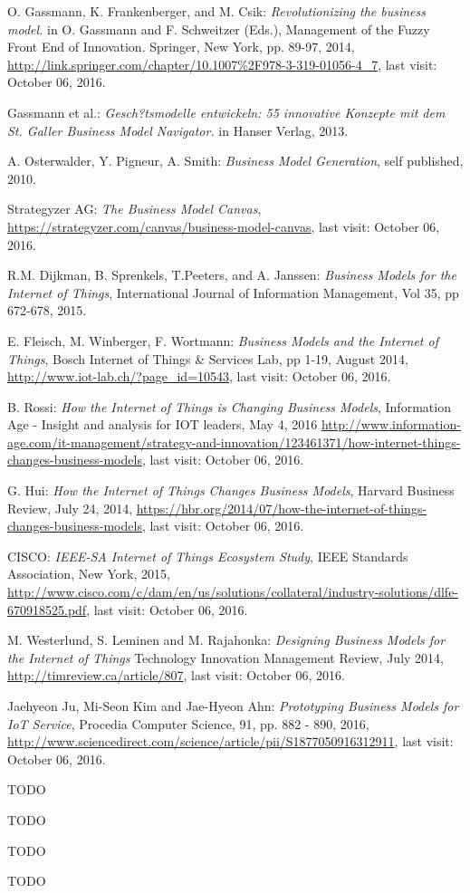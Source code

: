  \begin{thebibliography}{99}
	  O. Gassmann, K. Frankenberger, and M. Csik: \emph{Revolutionizing the business model.} in O. Gassmann and F. Schweitzer (Eds.), Management of the Fuzzy Front End of Innovation. Springer, New York, pp. 89-97, 2014, \url{http://link.springer.com/chapter/10.1007%2F978-3-319-01056-4_7}, last visit: October 06, 2016.

	  Gassmann et al.: \emph{Gesch?tsmodelle entwickeln: 55 innovative Konzepte mit dem St. Galler Business Model Navigator.} in Hanser Verlag, 2013.

	  A. Osterwalder, Y. Pigneur, A. Smith: \emph{Business Model Generation}, self published, 2010.

	  Strategyzer AG: \emph{The Business Model Canvas}, \url{https://strategyzer.com/canvas/business-model-canvas}, last visit: October 06, 2016.

	  R.M. Dijkman, B. Sprenkels, T.Peeters, and A. Janssen: \emph{Business Models for the Internet of Things}, International Journal of Information Management, Vol 35, pp 672-678, 2015.

	  E. Fleisch, M. Winberger, F. Wortmann: \emph{Business Models and the Internet of Things}, Bosch Internet of Things \& Services Lab, pp 1-19, August 2014, \url{http://www.iot-lab.ch/?page_id=10543}, last visit: October 06, 2016.

	  B. Rossi: \emph{How the Internet of Things is Changing Business Models}, Information Age - Insight and analysis for IOT leaders, May 4, 2016 \url{http://www.information-age.com/it-management/strategy-and-innovation/123461371/how-internet-things-changes-business-models}, last visit: October 06, 2016.

	  G. Hui: \emph{How the Internet of Things Changes Business Models}, Harvard Business Review, July 24, 2014, \url{https://hbr.org/2014/07/how-the-internet-of-things-changes-business-models}, last visit: October 06, 2016.

	  CISCO: \emph{IEEE-SA Internet of Things Ecosystem Study}, IEEE Standards Association, New York, 2015, \url{http://www.cisco.com/c/dam/en/us/solutions/collateral/industry-solutions/dlfe-670918525.pdf}, last visit: October 06, 2016.

	 M. Westerlund, S. Leminen and M. Rajahonka: \emph{Designing Business Models for the Internet of Things} Technology Innovation Management Review, July 2014, \url{http://timreview.ca/article/807}, last visit: October 06, 2016.

	 Jaehyeon Ju, Mi-Seon Kim and Jae-Hyeon Ahn: \emph{Prototyping Business Models for IoT Service}, Procedia Computer Science, 91, pp. 882 - 890, 2016, \url{http://www.sciencedirect.com/science/article/pii/S1877050916312911}, last visit: October 06, 2016.

	 TODO

	 TODO

	 TODO

	 TODO
 \end{thebibliography}

